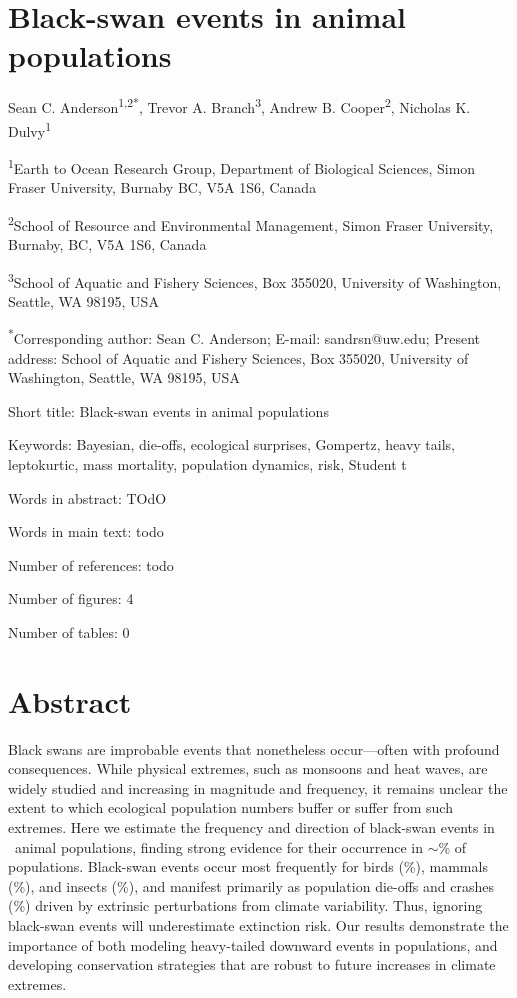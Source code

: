 \section{Black-swan events in animal populations}

Sean C. Anderson\textsuperscript{1,2*}, Trevor A.
Branch\textsuperscript{3}, Andrew B. Cooper\textsuperscript{2}, Nicholas K.
Dulvy\textsuperscript{1}

\textsuperscript{1}Earth to Ocean Research Group, Department of Biological
Sciences, Simon Fraser University, Burnaby BC, V5A 1S6, Canada

\textsuperscript{2}School of Resource and Environmental Management, Simon
Fraser University, Burnaby, BC, V5A 1S6, Canada

\textsuperscript{3}School of Aquatic and Fishery Sciences, Box 355020,
University of Washington, Seattle, WA 98195, USA

\textsuperscript{*}Corresponding author: Sean C. Anderson; E-mail:
sandrsn@uw.edu; Present address: School of Aquatic and Fishery Sciences, Box
355020, University of Washington, Seattle, WA 98195, USA

Short title: Black-swan events in animal populations

Keywords:
Bayesian,
die-offs,
ecological surprises,
Gompertz,
heavy tails,
leptokurtic,
mass mortality,
population dynamics,
risk,
Student t

Words in abstract: TOdO

Words in main text: todo

Number of references: todo

Number of figures: 4

Number of tables: 0

\newpage

\section{Abstract}

Black swans are improbable events that nonetheless
occur---often with profound consequences. While physical extremes, such as
monsoons and heat waves, are widely studied and increasing in magnitude and
frequency, it remains unclear the extent to which ecological population numbers
buffer or suffer from such extremes. Here we estimate the frequency and
direction of black-swan events in \NPops\ animal populations, finding strong
evidence for their occurrence in \(\sim\)\overallBasePerc \% of populations.
Black-swan events occur most frequently for birds (\birdPH \%), mammals
(\mammalsPH \%), and insects (\insectsPH \%), and manifest primarily as
population die-offs and crashes (\percBSDown \%) driven by extrinsic
perturbations from climate variability. Thus, ignoring black-swan events will
underestimate extinction risk. Our results demonstrate the importance of both
modeling heavy-tailed downward events in populations, and developing
conservation strategies that are robust to future increases in climate
extremes.

